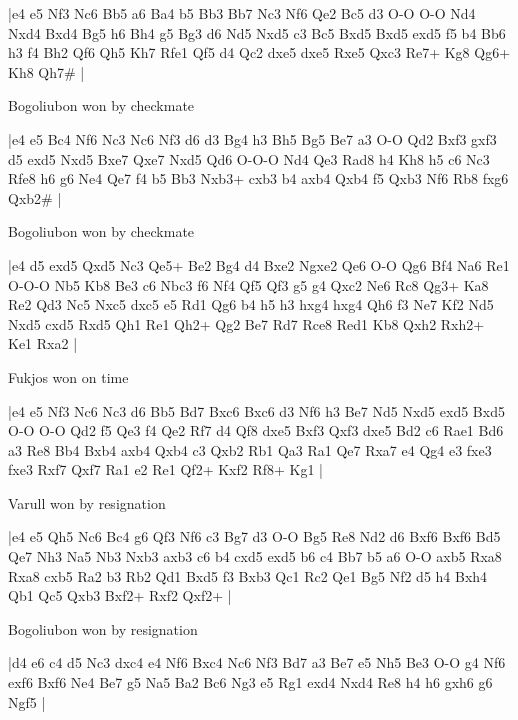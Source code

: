 \makegametitle
|e4 e5 Nf3 Nc6 Bb5 a6 Ba4 b5 Bb3 Bb7 Nc3 Nf6 Qe2 Bc5 d3 O-O O-O Nd4 Nxd4 Bxd4 Bg5 h6 Bh4 g5 Bg3 d6 Nd5 Nxd5 c3 Bc5 Bxd5 Bxd5 exd5 f5 b4 Bb6 h3 f4 Bh2 Qf6 Qh5 Kh7 Rfe1 Qf5 d4 Qc2 dxe5 dxe5 Rxe5 Qxc3 Re7+ Kg8 Qg6+ Kh8 Qh7\#  |

\showboard

Bogoliubon won by checkmate

\makegametitle
|e4 e5 Bc4 Nf6 Nc3 Nc6 Nf3 d6 d3 Bg4 h3 Bh5 Bg5 Be7 a3 O-O Qd2 Bxf3 gxf3 d5 exd5 Nxd5 Bxe7 Qxe7 Nxd5 Qd6 O-O-O Nd4 Qe3 Rad8 h4 Kh8 h5 c6 Nc3 Rfe8 h6 g6 Ne4 Qe7 f4 b5 Bb3 Nxb3+ cxb3 b4 axb4 Qxb4 f5 Qxb3 Nf6 Rb8 fxg6 Qxb2\#  |

\showboard

Bogoliubon won by checkmate

\makegametitle
|e4 d5 exd5 Qxd5 Nc3 Qe5+ Be2 Bg4 d4 Bxe2 Ngxe2 Qe6 O-O Qg6 Bf4 Na6 Re1 O-O-O Nb5 Kb8 Be3 c6 Nbc3 f6 Nf4 Qf5 Qf3 g5 g4 Qxc2 Ne6 Rc8 Qg3+ Ka8 Re2 Qd3 Nc5 Nxc5 dxc5 e5 Rd1 Qg6 b4 h5 h3 hxg4 hxg4 Qh6 f3 Ne7 Kf2 Nd5 Nxd5 cxd5 Rxd5 Qh1 Re1 Qh2+ Qg2 Be7 Rd7 Rce8 Red1 Kb8 Qxh2 Rxh2+ Ke1 Rxa2  |

\showboard

Fukjos won on time

\makegametitle
|e4 e5 Nf3 Nc6 Nc3 d6 Bb5 Bd7 Bxc6 Bxc6 d3 Nf6 h3 Be7 Nd5 Nxd5 exd5 Bxd5 O-O O-O Qd2 f5 Qe3 f4 Qe2 Rf7 d4 Qf8 dxe5 Bxf3 Qxf3 dxe5 Bd2 c6 Rae1 Bd6 a3 Re8 Bb4 Bxb4 axb4 Qxb4 c3 Qxb2 Rb1 Qa3 Ra1 Qe7 Rxa7 e4 Qg4 e3 fxe3 fxe3 Rxf7 Qxf7 Ra1 e2 Re1 Qf2+ Kxf2 Rf8+ Kg1  |

\showboard

Varull won by resignation

\makegametitle
|e4 e5 Qh5 Nc6 Bc4 g6 Qf3 Nf6 c3 Bg7 d3 O-O Bg5 Re8 Nd2 d6 Bxf6 Bxf6 Bd5 Qe7 Nh3 Na5 Nb3 Nxb3 axb3 c6 b4 cxd5 exd5 b6 c4 Bb7 b5 a6 O-O axb5 Rxa8 Rxa8 cxb5 Ra2 b3 Rb2 Qd1 Bxd5 f3 Bxb3 Qc1 Rc2 Qe1 Bg5 Nf2 d5 h4 Bxh4 Qb1 Qc5 Qxb3 Bxf2+ Rxf2 Qxf2+  |

\showboard

Bogoliubon won by resignation

\makegametitle
|d4 e6 c4 d5 Nc3 dxc4 e4 Nf6 Bxc4 Nc6 Nf3 Bd7 a3 Be7 e5 Nh5 Be3 O-O g4 Nf6 exf6 Bxf6 Ne4 Be7 g5 Na5 Ba2 Bc6 Ng3 e5 Rg1 exd4 Nxd4 Re8 h4 h6 gxh6 g6 Ngf5  |

